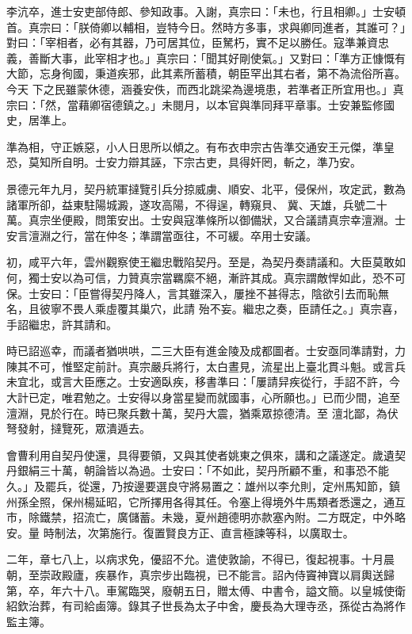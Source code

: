 \begin{pinyinscope}
 李沆卒，進士安吏部侍郎、參知政事。入謝，真宗曰：「未也，行且相卿。」士安頓首。真宗曰：「朕倚卿以輔相，豈特今日。然時方多事，求與卿同進者，其誰可？」對曰：「宰相者，必有其器，乃可居其位，臣駑朽，實不足以勝任。寇準兼資忠義，善斷大事，此宰相才也。」真宗曰：「聞其好剛使氣。」又對曰：「準方正慷慨有大節，忘身徇國，秉道疾邪，此其素所蓄積，朝臣罕出其右者，第不為流俗所喜。今天
 下之民雖蒙休德，涵養安佚，而西北跳梁為邊境患，若準者正所宜用也。」真宗曰：「然，當藉卿宿德鎮之。」未閱月，以本官與準同拜平章事。士安兼監修國史，居準上。



 準為相，守正嫉惡，小人日思所以傾之。有布衣申宗古告準交通安王元傑，準皇恐，莫知所自明。士安力辯其誣，下宗古吏，具得奸罔，斬之，準乃安。



 景德元年九月，契丹統軍撻覽引兵分掠威虜、順安、北平，侵保州，攻定武，數為諸軍所卻，益東駐陽城澱，遂攻高陽，不得逞，轉窺貝、
 冀、天雄，兵號二十萬。真宗坐便殿，問策安出。士安與寇準條所以御備狀，又合議請真宗幸澶淵。士安言澶淵之行，當在仲冬；準謂當亟往，不可緩。卒用士安議。



 初，咸平六年，雲州觀察使王繼忠戰陷契丹。至是，為契丹奏請議和。大臣莫敢如何，獨士安以為可信，力贊真宗當羈縻不絕，漸許其成。真宗謂敵悍如此，恐不可保。士安曰：「臣嘗得契丹降人，言其雖深入，屢挫不甚得志，陰欲引去而恥無名，且彼寧不畏人乘虛覆其巢穴，此請
 殆不妄。繼忠之奏，臣請任之。」真宗喜，手詔繼忠，許其請和。



 時已詔巡幸，而議者猶哄哄，二三大臣有進金陵及成都圖者。士安亟同準請對，力陳其不可，惟堅定前計。真宗嚴兵將行，太白晝見，流星出上臺北貫斗魁。或言兵未宜北，或言大臣應之。士安適臥疾，移書準曰：「屢請舁疾從行，手詔不許，今大計已定，唯君勉之。士安得以身當星變而就國事，心所願也。」已而少間，追至澶淵，見於行在。時已聚兵數十萬，契丹大震，猶乘眾掠德清。至
 澶北鄙，為伏弩發射，撻覽死，眾潰遁去。



 會曹利用自契丹使還，具得要領，又與其使者姚東之俱來，講和之議遂定。歲遺契丹銀絹三十萬，朝論皆以為過。士安曰：「不如此，契丹所顧不重，和事恐不能久。」及罷兵，從還，乃按邊要選良守將易置之：雄州以李允則，定州馬知節，鎮州孫全照，保州楊延昭，它所擇用各得其任。令塞上得境外牛馬類者悉還之，通互市，除鐵禁，招流亡，廣儲蓄。未幾，夏州趙德明亦款塞內附。二方既定，中外略安。量
 時制法，次第施行。復置賢良方正、直言極諫等科，以廣取士。



 二年，章七八上，以病求免，優詔不允。遣使敦諭，不得已，復起視事。十月晨朝，至崇政殿廬，疾暴作，真宗步出臨視，已不能言。詔內侍竇神寶以肩輿送歸第，卒，年六十八。車駕臨哭，廢朝五日，贈太傅、中書令，謚文簡。以皇城使衛紹欽治葬，有司給鹵簿。錄其子世長為太子中舍，慶長為大理寺丞，孫從古為將作監主簿。




\end{pinyinscope}

